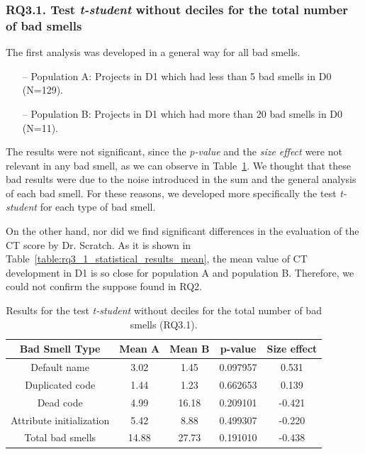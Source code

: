 \subsubsection{RQ3.1. Test \textit{t-student} without deciles for the total number of bad smells}
\label{subsubsec:RQ3_1_statistical_results}

The first analysis was developed in a general way for all bad smells.

\begin{itemize}
    \item[--] Population A: Projects in D1 which had less than 5 bad smells in D0 (N=129).
    \item[--] Population B: Projects in D1 which had more than 20 bad smells in D0 (N=11).
\end{itemize}


The results were not significant, since the \textit{p-value} and the \textit{size effect} were not relevant in any bad smell, as we can observe in Table~\ref{table:rq3_1_statistical_results}. We thought that these bad results were due to the noise introduced in the sum and the general analysis of each bad smell. For these reasons, we developed 
more specifically the test \textit{t-student} for each type of bad smell. 

On the other hand, nor did we find significant differences in the evaluation of the CT score by Dr. Scratch. As it is shown in Table~\ref{table:rq3_1_statistical_results_mean}, the mean value of CT development in D1 is so close for population A and population B. Therefore, we could not confirm the suppose found in RQ2. 



\begin{table}
 \begin{center}
  \begin{tabular}{|c|c|c|c|c|}
    \hline
    \textbf{Bad Smell Type} & \textbf{Mean A} & \textbf{Mean B} & \textbf{p-value} & \textbf{Size effect} \\ \hline
    Default name & 3.02 & 1.45 & 0.097957 & 0.531 \\ \hline
    Duplicated code & 1.44 & 1.23 & 0.662653 & 0.139 \\ \hline
    Dead code & 4.99 & 16.18 & 0.209101 & -0.421 \\ \hline
    Attribute initialization & 5.42 & 8.88 & 0.499307 & -0.220 \\ \hline
    Total bad smells & 14.88 & 27.73 & 0.191010 & -0.438 \\ \hline
  \end{tabular}
  \caption{Results for the test \textit{t-student} without deciles for the total number of bad smells (RQ3.1).}
  \label{table:rq3_1_statistical_results}
 \end{center}
\end{table}

